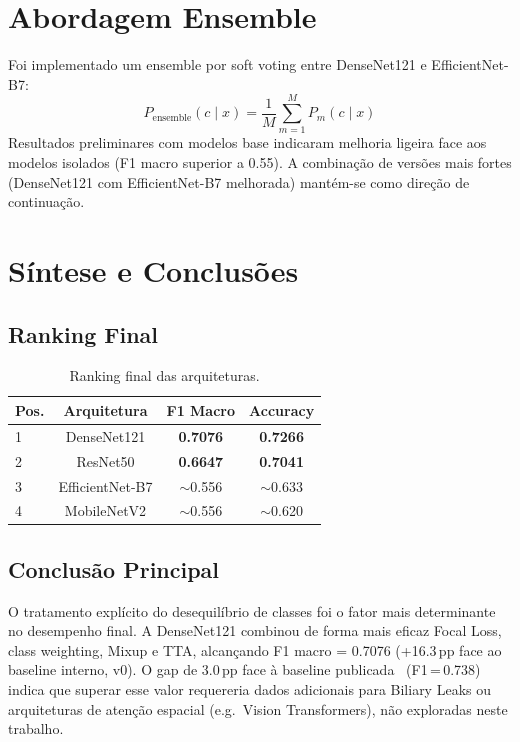 \documentclass[runningheads]{llncs}
\begin{document}
\section{Abordagem Ensemble}
Foi implementado um ensemble por soft voting entre DenseNet121 e
EfficientNet-B7:
\begin{equation}
P_{\text{ensemble}}(c\mid x) = \frac{1}{M}\sum_{m=1}^{M} P_m(c\mid x)
\end{equation}
Resultados preliminares com modelos base indicaram melhoria ligeira face aos
modelos isolados (F1 macro superior a 0.55). A combinação de versões mais
fortes (DenseNet121 com EfficientNet-B7 melhorada) mantém-se como direção de
continuação.

\section{Síntese e Conclusões}

\subsection{Ranking Final}
\begin{table}[ht]
\caption{Ranking final das arquiteturas.}
\label{tab:ranking}
\centering
\begin{tabular}{lccc}
\hline
Pos. & Arquitetura & F1 Macro & Accuracy \\
\hline
1 & DenseNet121 & \textbf{0.7076} & \textbf{0.7266} \\
2 & ResNet50 & \textbf{0.6647} & \textbf{0.7041} \\
3 & EfficientNet-B7 & \(\sim\)0.556 & \(\sim\)0.633 \\
4 & MobileNetV2 & \(\sim\)0.556 & \(\sim\)0.620 \\
\hline
\end{tabular}
\end{table}

\subsection{Conclusão Principal}
O tratamento explícito do desequilíbrio de classes foi o fator mais
determinante no desempenho final. A DenseNet121 combinou de forma mais eficaz
Focal Loss, class weighting, Mixup e TTA, alcançando F1 macro = 0.7076
(+16.3\,pp face ao baseline interno, v0). O gap de 3.0\,pp face à baseline
publicada~\cite{martins2025} (F1\,=\,0.738) indica que superar esse valor
requereria dados adicionais para Biliary Leaks ou arquiteturas de
atenção espacial (e.g.\ Vision Transformers), não exploradas neste trabalho.
\end{document}
